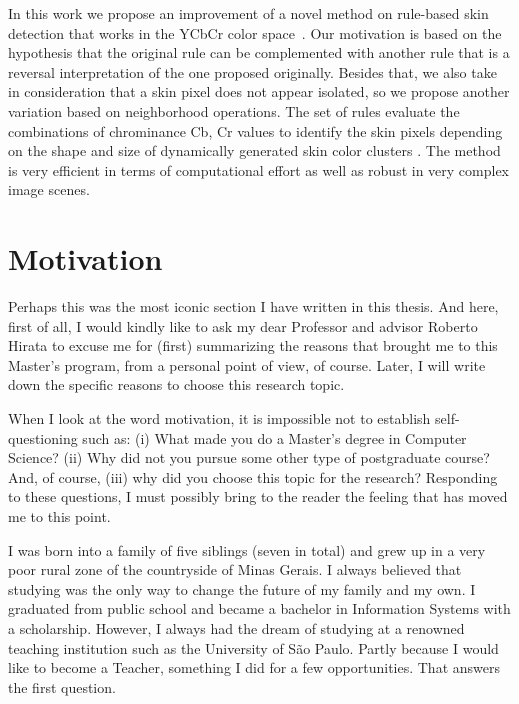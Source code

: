 In this work we propose an improvement of a novel method on rule-based skin detection that works in the YCbCr color space~\citep{brancati:17}. Our motivation is based on the hypothesis that the original rule can be complemented with another rule that is a reversal interpretation of the one proposed originally. Besides that, we also take in consideration that a skin pixel does not appear isolated, so we propose another variation based on neighborhood operations. The set of rules evaluate the combinations of chrominance Cb, Cr values to identify the skin pixels depending on the shape and size of dynamically generated skin color clusters \citep{brancati:17}. The method is very efficient in terms of computational effort as well as robust in very complex image scenes.


\section{Motivation}
\label{sec:motivation}

Perhaps this was the most iconic section I have written in this thesis. And here, first of all, I would kindly like to ask my dear Professor and advisor Roberto Hirata to excuse me for (first) summarizing the reasons that brought me to this Master's program, from a personal point of view, of course. Later, I will write down the specific reasons to choose this research topic.

When I look at the word motivation, it is impossible not to establish self-questioning such as: (i) What made you do a Master's degree in Computer Science? (ii) Why did not you pursue some other type of postgraduate course? And, of course, (iii) why did you choose this topic for the research? Responding to these questions, I must possibly bring to the reader the feeling that has moved me to this point.

I was born into a family of five siblings (seven in total) and grew up in a very poor rural zone of the countryside of Minas Gerais. I always believed that studying was the only way to change the future of my family and my own. I graduated from public school and became a bachelor in Information Systems with a scholarship. However, I always had the dream of studying at a renowned teaching institution such as the University of São Paulo. Partly because I would like to become a Teacher, something I did for a few opportunities. That answers the first question.


